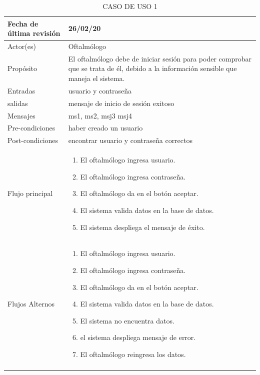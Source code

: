 \documentclass[10pt]{article}
\begin{document}
\begin{longtable}{|p{3.8cm}|p{10.8cm}|}
\hline
Fecha de última revisión & 26/02/20\\
\hline
Actor(es) & Oftalmólogo \\
\hline
Propósito & El oftalmólogo debe de iniciar sesión para poder comprobar que se trata de él, debido a la información sensible que maneja el sistema.\\
\hline
Entradas & usuario y contraseña\\
\hline
salidas & mensaje de inicio de sesión exitoso\\
\hline
Mensajes & ms1, ms2, msj3 msj4\\
\hline
Pre-condiciones & haber creado un usuario \\
\hline
Post-condiciones &  encontrar usuario y contraseña correctos \\
\hline
Flujo principal & \begin{enumerate}
    \item El oftalmólogo ingresa usuario.
    \item El oftalmólogo ingresa contraseña.
    \item El oftalmólogo da en el botón aceptar.
    \item El sistema valida datos en la base de datos.
    \item El sistema despliega el mensaje de éxito.
\end{enumerate}
    \\
\hline
Flujos Alternos &  \begin{enumerate}
    \item El oftalmólogo ingresa usuario.
    \item El oftalmólogo ingresa contraseña.
    \item El oftalmólogo da en el botón aceptar.
    \item El sistema valida datos en la base de datos.
    \item El sistema no encuentra datos.
    \item el sistema despliega mensaje de error.
    \item El oftalmólogo reingresa los datos.
\end{enumerate}\\
\hline
\caption{CASO DE USO 1}
\label{tabla1}
\end{longtable}
\end{document}
